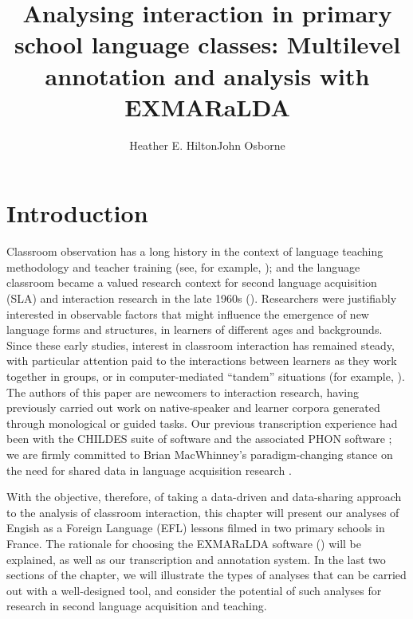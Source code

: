 \documentclass[output=paper,colorlinks,citecolor=brown,modfonts,nonflat]{../langscibook}
\author{Heather E. Hilton\affiliation{Université Lumière Lyon 2}\orcid{}\lastand John Osborne\affiliation{Université Savoie Mont Blanc}\orcid{}}
\title{Analysing interaction in primary school language classes: Multilevel annotation and analysis with EXMARaLDA}
\begin{document}
\maketitle 
{}





\section{Introduction~}

Classroom observation has a long history in the context of language teaching methodology and teacher training (see, for example, \citealt{Passy1885, Brebner1898}); and the language classroom became a valued research context for second language acquisition (SLA) and interaction research in the late 1960s (\citealt{Moskowitz1976, Jarvis1968, Wragg1970, SeligerLong1983, Allwright1984, Véronique1992}). Researchers were justifiably interested in observable factors that might influence the emergence of new language forms and structures, in learners of different ages and backgrounds. Since these early studies, interest in classroom interaction has remained steady, with particular attention paid to the interactions between learners as they work together in groups, or in computer-mediated “tandem” situations (for example, \citealt{DevelotteEtAl2008}). The authors of this paper are newcomers to interaction research, having previously carried out work on native-speaker and learner corpora generated through monological or guided tasks. Our previous transcription experience had been with the CHILDES suite of software \citep{MacWhinney2000} and the associated PHON software \citep{RoseEtAl2006}; we are firmly committed to Brian MacWhinney’s paradigm-changing stance on the need for shared data in language acquisition research \citep[27-30]{MacWhinney2010}.

With the objective, therefore, of taking a data-driven and data-sharing approach to the analysis of classroom interaction, this chapter will present our analyses of Engish as a Foreign Language  (EFL) lessons filmed in two primary schools in France. The rationale for choosing the EXMARaLDA software (\citealt{SchmidtWörner2014}) will be explained, as well as our transcription and annotation system. In the last two sections of the chapter, we will illustrate the types of analyses that can be carried out with a well-designed tool, and consider the potential of such analyses for research in second language acquisition and teaching.
\end{document}

